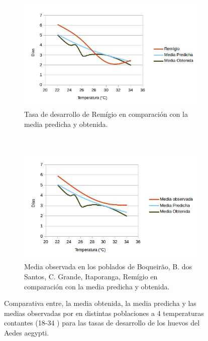 \begin{figure}[!htbp]
\begin{subfigure}[b]{0.45\textwidth}
    \end{subfigure}
    \begin{subfigure}[t]{0.45\textwidth}
            \includegraphics[width=\textwidth]{capitulo-6/graphics/desarrollo-huevos-5.png}
            \caption{Tasa de desarrollo de Remígio en comparación con la media predicha y obtenida.}
    \end{subfigure}
    ~~~~
    \begin{subfigure}[t]{0.45\textwidth}
            \includegraphics[width=\textwidth]{capitulo-6/graphics/desarrollo-huevos-6.png}
            \caption{Media observada en los poblados de Boqueirão, B. dos Santos, C. Grande, Itaporanga, Remígio en comparación con la media predicha y obtenida.}

    \end{subfigure}
    \caption{\label{fig:desarrollo-huevo-baserra2006}
    Comparativa entre, la media obtenida, la media predicha y las medias observadas por \cite{
    BESERRA2006} en distintas poblaciones a 4 temperaturas contantes (18-34 \textcelsius) para
    las tasas de desarrollo de los huevos del Aedes aegypti.}
\end{figure}

